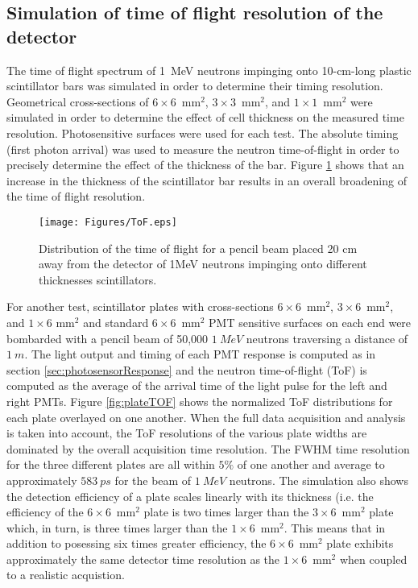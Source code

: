 \subsection{Simulation of time of flight resolution of the detector}

The time of flight spectrum of 1~MeV neutrons impinging onto 10-cm-long plastic scintillator bars was simulated in order to determine their timing resolution. Geometrical cross-sections of $6 \times 6$~mm$^{2}$, $3 \times 3$~mm$^{2}$, and $1 \times 1$~mm$^{2}$ were simulated in order to determine the effect of cell thickness on the measured time resolution. Photosensitive surfaces were used for each test. The absolute timing (first photon arrival) was used to measure the neutron time-of-flight in order to precisely determine the effect of the thickness of the bar. Figure \ref{fig:simToF} shows that an increase in the thickness of the scintillator bar results in an overall broadening of the time of flight resolution.

\begin{figure}[tb]
\centering
\texttt{[image: Figures/ToF.eps]}
\caption{Distribution of the time of flight for a pencil beam  placed 20 cm away from the detector of 1MeV  neutrons impinging onto different thicknesses scintillators.}
\label{fig:simToF}
\end{figure}

For another test, scintillator plates with cross-sections $6 \times 6$~mm$^{2}$, $3 \times 6$~mm$^{2}$, and $1 \times 6$ mm$^{2}$ and standard $6 \times 6$~mm$^{2}$ PMT sensitive surfaces on each end were bombarded with a pencil beam of 50,000 $1~MeV$ neutrons traversing a distance of $1~m$. The light output and timing of each PMT response is computed as in section \ref{sec:photosensorResponse} and the neutron time-of-flight (ToF) is computed as the average of the arrival time of the light pulse for the left and right PMTs. Figure \ref{fig:plateTOF} shows the normalized ToF distributions for each plate overlayed on one another. When the full data acquisition and analysis is taken into account, the ToF resolutions of the various plate widths are dominated by the overall acquisition time resolution. The FWHM time resolution for the three different plates are all within $5\%$ of one another and average to approximately $583~ps$ for the beam of $1~MeV$ neutrons. The simulation also shows the detection efficiency of a plate scales linearly with its thickness (i.e. the efficiency of the $6 \times 6$~mm$^2$ plate is two times larger than the $3 \times 6$~mm$^2$ plate which, in turn, is three times larger than the $1 \times 6$~mm$^2$. This means that in addition to posessing six times greater efficiency, the $6 \times 6$~mm$^2$ plate exhibits approximately the same detector time resolution as the $1 \times 6$~mm$^2$ when coupled to a realistic acquistion.  

